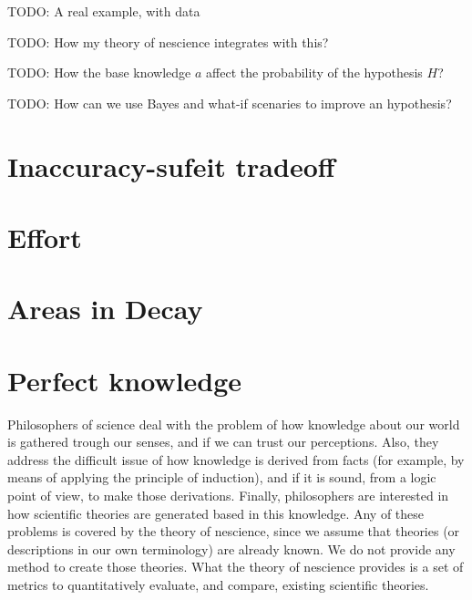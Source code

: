 \begin{example}
{\color{red} TODO: A real example, with data}
\end{example}

{\color{red} TODO: How my theory of nescience integrates with this?}

{\color{red} TODO: How the base knowledge $a$ affect the probability of the hypothesis $H$?}

{\color{red} TODO: How can we use Bayes and what-if scenaries to improve an hypothesis?}

%
%
\section{Inaccuracy-sufeit tradeoff}

%
%
\section{Effort}

%
%
\section{Areas in Decay}

%
%
\section{Perfect knowledge}

Philosophers of science deal with the problem of how knowledge about our world is gathered trough our senses, and if we can trust our perceptions. Also, they address the difficult issue of how knowledge is derived from facts (for example, by means of applying the principle of induction), and if it is sound, from a logic point of view, to make those derivations. Finally, philosophers are interested in how scientific theories are generated based in this knowledge. Any of these problems is covered by the theory of nescience, since we assume that theories (or descriptions in our own terminology) are already known. We do not provide any method to create those theories. What the theory of nescience provides is a set of metrics to quantitatively evaluate, and compare, existing scientific theories. 

